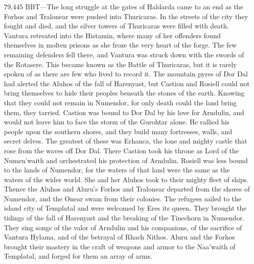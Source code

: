 \documentclass[smalldemyvopaper,11pt,twoside,onecolumn,openright,extrafontsizes]{memoir}
\begin{document}
{{79,445 BBT—The long struggle at the gates of Haldarda came to an end as the Forhos and Tralonear were pushed into Thuricaras. In the streets of the city they fought and died, and the silver towers of Thuricaras were filled with death. Vantura retreated into the Histamin, where many of her offenders found themselves in molten prisons as she froze the very heart of the forge. The few remaining defenders fell there, and Vantura was struck down with the swords of the Rotasere. This became known as the Battle of Thuricaras, but it is rarely spoken of as there are few who lived to record it.
	The mountain pyres of Dor Dal had alerted the Aluhos of the fall of Harenyast, but Castion and Rosiell could not bring themselves to hide their peoples beneath the stones of the earth. Knowing that they could not remain in Numendor, for only death could the land bring them, they tarried. Castion was bound to Dor Dal by his love for Arndulin, and would not leave him to face the storm of the Gurohtar alone. He rallied his people upon the southern shores, and they build many fortresses, walls, and secret delves. The greatest of these was Erhanca, the lone and mighty castle that rose from the waves off Dor Dal. There Castion took his throne as Lord of the Numen’waith and orchestrated his protection of Arndulin. Rosiell was less bound to the lands of Numendor, for the waters of that land were the same as the waters of the wider world. She and her Aluhos took to their mighty fleet of ships. Thence the Aluhos and Aluru’s Forhos and Tralonear departed from the shores of Numendor, and the Onear swam from their colonies. The refugees sailed to the island city of Templatal and were welcomed by Eres its queen. They brought the tidings of the fall of Harenyast and the breaking of the Tinechorn in Numendor. They sing songs of the valor of Arndulin and his companions, of the sacrifice of Vantura Hylama, and of the betrayal of Rhach Nithos. Aluru and the Forhos brought their mastery in the craft of weapons and armor to the Naa’waith of Templatal, and forged for them an array of arms.

}}
\end{document}
